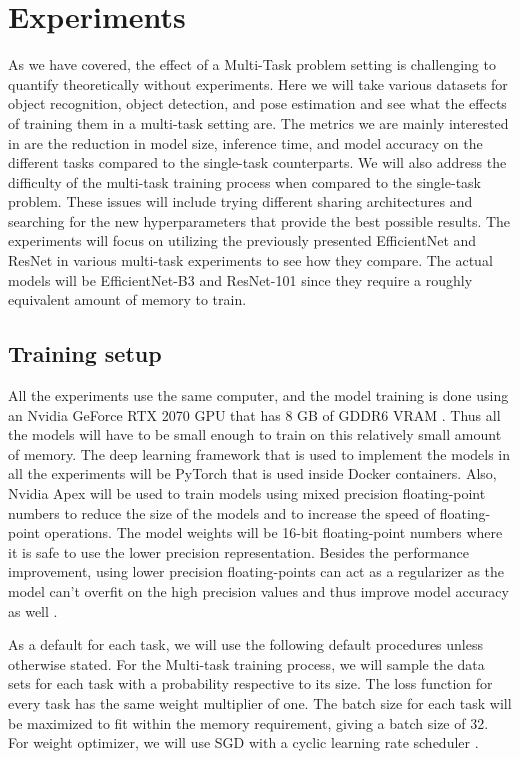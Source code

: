 
\chapter{Experiments}
As we have covered, the effect of a Multi-Task problem setting is challenging to quantify theoretically without experiments.
Here we will take various datasets for object recognition, object detection, and pose estimation and see what the effects of training them in a multi-task setting are.
The metrics we are mainly interested in are the reduction in model size, inference time, and model accuracy on the different tasks compared to the single-task counterparts.
We will also address the difficulty of the multi-task training process when compared to the single-task problem.
These issues will include trying different sharing architectures and searching for the new hyperparameters that provide the best possible results.
The experiments will focus on utilizing the previously presented EfficientNet and ResNet in various multi-task experiments to see how they compare.
The actual models will be EfficientNet-B3 and ResNet-101 since they require a roughly equivalent amount of memory to train.

\section{Training setup}
All the experiments use the same computer, and the model training is done using an Nvidia GeForce RTX 2070 GPU that has 8 GB of GDDR6 VRAM \citep{nvidiaRTX}.
Thus all the models will have to be small enough to train on this relatively small amount of memory.
The deep learning framework that is used to implement the models in all the experiments will be PyTorch \citep{pytorch} that is used inside Docker \citep{docker} containers.
Also, Nvidia Apex \citep{Apex} will be used to train models using mixed precision floating-point numbers to reduce the size of the models and to increase the speed of floating-point operations.
The model weights will be 16-bit floating-point numbers where it is safe to use the lower precision representation.
Besides the performance improvement, using lower precision floating-points can act as a regularizer as the model can't overfit on the high precision values and thus improve model accuracy as well \citep{mixedTraining}.

As a default for each task, we will use the following default procedures unless otherwise stated.
For the Multi-task training process, we will sample the data sets for each task with a probability respective to its size.
The loss function for every task has the same weight multiplier of one.
The batch size for each task will be maximized to fit within the memory requirement, giving a batch size of 32.
For weight optimizer, we will use SGD with a cyclic learning rate scheduler \citep{cycliclr}.

